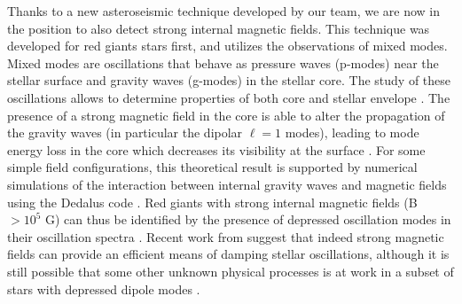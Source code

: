 Thanks to a new asteroseismic technique developed by our team, we are now in the position to also detect strong internal magnetic fields.
This technique was developed for red giants stars first, and utilizes the observations of mixed modes. Mixed modes are
oscillations that behave as pressure waves (p-modes) near the stellar surface and gravity waves (g-modes) in the stellar core.
The study of these oscillations allows to determine properties of both core and stellar envelope \citep[e.g][]{Beck_2011}.
The presence of a strong magnetic field in the core is able to alter the propagation of the gravity waves (in particular the dipolar $\ell =1$ modes),
leading to mode energy loss in the core which decreases its visibility at the surface \citep{Fuller_2015}.
For some simple field configurations, this theoretical result is supported  by numerical simulations of the interaction between
internal gravity waves and magnetic fields using the Dedalus code \citep{Lecoanet_2016}.
Red giants with strong internal magnetic fields (B $> 10^5$ G) can thus be identified by the presence of depressed oscillation modes in their oscillation spectra \citep{Fuller_2015,Stello_2016}. Recent work from \citet{2017MNRAS.467.3212L} suggest that indeed strong magnetic fields can provide an efficient means of damping stellar oscillations, although it is still possible that some other unknown physical processes is at work in a subset of stars with depressed dipole modes \citet{Mosser_2017}.
